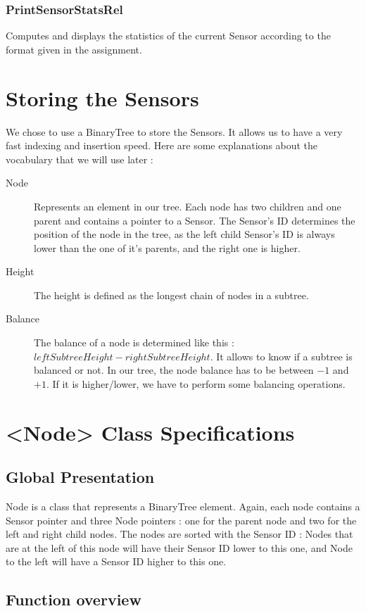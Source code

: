 \documentclass[10pt]{article}
\begin{document}
\subsubsection*{PrintSensorStatsRel}
Computes and displays the statistics of the current Sensor according to the format given in the assignment.

\section{Storing the Sensors}
We chose to use a BinaryTree to store the Sensors. It allows us to have a very fast indexing and insertion speed.
Here are some explanations about the vocabulary that we will use later :
\begin{description}
	\item[Node] Represents an element in our tree. Each node has two children and one parent and contains a pointer to a Sensor. The Sensor's ID determines the position of the node in the tree, as the left child Sensor's ID is always lower than the one of it's parents, and the right one is higher.
	\item[Height] The height is defined as the longest chain of nodes in a subtree.
	\item[Balance] The balance of a node is determined like this : $ leftSubtreeHeight - rightSubtreeHeight$. It allows to know if a subtree is balanced or not. In our tree, the node balance has to be between $-1$ and $+1$. If it is higher/lower, we have to perform some balancing operations.
\end{description}

\section{<Node> Class Specifications}
\subsection{Global Presentation}
Node is a class that represents a BinaryTree element. Again, each node contains a Sensor pointer and three Node pointers : one for the parent node and two for the left and right child nodes. The nodes are sorted with the Sensor ID : Nodes that are at the left of this node will have their Sensor ID lower to this one, and Node to the left will have a Sensor ID higher to this one.

\subsection{Function overview}
\end{document}

